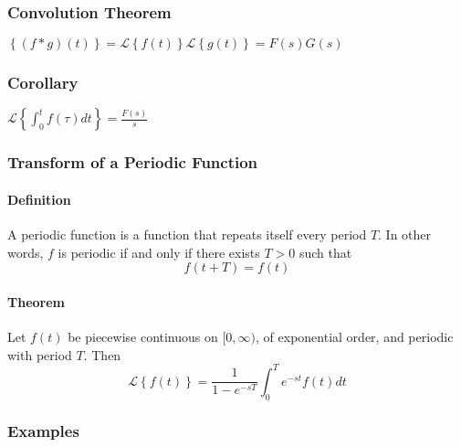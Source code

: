 \documentclass{article}
\begin{document}
\subsubsection{Convolution Theorem}
$\left\{(f*g)(t)\right\}=\mathcal{L}\left\{f(t)\right\}\mathcal{L}\left\{g(t)\right\}=F(s)G(s)$
\subsubsection{Corollary}
$\mathcal{L}\left\{\int_{0}^{t}f(\tau) dt\right\}=\frac{F(s)}{s}$
\subsubsection{Transform of a Periodic Function}
\paragraph{Definition} A periodic function is a function that repeats itself every period $T$. In other words, $f$ is periodic if and only if there exists $T>0$ such that $$f(t+T)=f(t)$$
\paragraph{Theorem} Let $f(t)$ be piecewise continuous on $[0,\infty)$, of exponential order, and periodic with period $T$. Then $$\mathcal{L}\left\{f(t)\right\}=\frac{1}{1-e^{-sT}}\int_{0}^{T}e^{-st}f(t)dt$$
\subsubsection{Examples}
\end{document}
